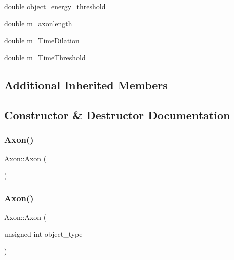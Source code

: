 \begin{DoxyCompactItemize}
double \mbox{\hyperlink{classAxon_a20223e0edff81afc14afbb5948570946}{object\+\_\+energy\+\_\+threshold}}
\item 
double \mbox{\hyperlink{classAxon_aeabc708a12965b17b5051a4fb11804c2}{m\+\_\+axonlength}}
\item 
double \mbox{\hyperlink{classAxon_ac477f6fc442313e4ba4eb3b069b9e5cf}{m\+\_\+\+Time\+Dilation}}
\item 
double \mbox{\hyperlink{classAxon_ae00fc37fb241ab5551a3cce4fc2a6299}{m\+\_\+\+Time\+Threshold}}
\end{DoxyCompactItemize}
\subsection*{Additional Inherited Members}


\subsection{Constructor \& Destructor Documentation}
\mbox{\label{classAxon_a1a0703b026b74c83e418613d929c5d22}} 
\subsubsection{\texorpdfstring{Axon()}{Axon()}\hspace{0.1cm}{\footnotesize\ttfamily [1/4]}}
{\footnotesize\ttfamily Axon\+::\+Axon (\begin{DoxyParamCaption}{ }\end{DoxyParamCaption})\hspace{0.3cm}{\ttfamily [inline]}}

\mbox{\label{classAxon_a7cc05238af77735983111d1ca58c9c9b}} 
\subsubsection{\texorpdfstring{Axon()}{Axon()}\hspace{0.1cm}{\footnotesize\ttfamily [2/4]}}
{\footnotesize\ttfamily Axon\+::\+Axon (\begin{DoxyParamCaption}\item[{unsigned int}]{object\+\_\+type }\end{DoxyParamCaption})\hspace{0.3cm}{\ttfamily [inline]}}

